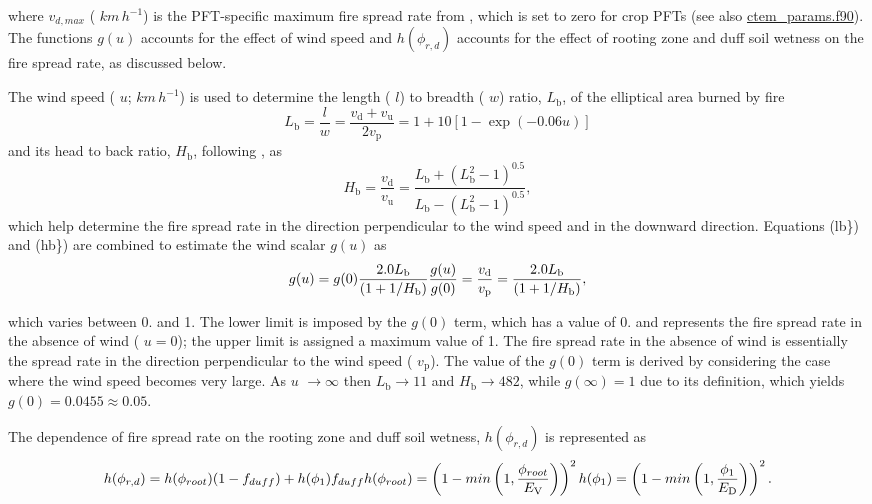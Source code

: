 where $v_{d,max}$ ( $km\,h^{-1}$) is the P\+F\+T-\/specific maximum fire spread rate from \cite{Li20121c2}, which is set to zero for crop P\+F\+Ts (see also \hyperlink{ctem__params_8f90}{ctem\+\_\+params.\+f90}). The functions $g(u)$ accounts for the effect of wind speed and $ h(\phi_{r, d})$ accounts for the effect of rooting zone and duff soil wetness on the fire spread rate, as discussed below.

The wind speed ( $u$; $km\,h^{-1}$) is used to determine the length ( $l$) to breadth ( $w$) ratio, $L_\mathrm{b}$, of the elliptical area burned by fire \[ \label{lb} L_\mathrm{b}= \frac{l}{w} = \frac{v_\mathrm{d} + v_\mathrm{u}}{2v_\mathrm{p}} = 1 + 10 [1 -\exp(-0.06 u)] \] and its head to back ratio, $H_\mathrm{b}$, following \cite{Li20121c2}, as \[ \label{hb} H_\mathrm{b} = \frac{v_\mathrm{d}}{v_\mathrm{u}} = \frac{L_\mathrm{b} + (L_\mathrm{b}^2 - 1)^{0.5}}{L_\mathrm{b} - (L_\mathrm{b}^2 - 1)^{0.5}}, \] which help determine the fire spread rate in the direction perpendicular to the wind speed and in the downward direction. Equations (lb\}) and (hb\}) are combined to estimate the wind scalar $g(u)$ as \[ g(u)= g(0) \frac{2.0 L_\mathrm{b}}{(1 + 1/H_\mathrm{b})} \nonumber\\ \frac{g(u)}{g(0)}=\frac{v_\mathrm{d}}{v_\mathrm{p}} = \frac{2.0 L_\mathrm{b}}{(1 + 1/H_\mathrm{b})}, \]

which varies between 0. and 1. The lower limit is imposed by the $g(0)$ term, which has a value of 0. and represents the fire spread rate in the absence of wind ( $u = 0$); the upper limit is assigned a maximum value of 1. The fire spread rate in the absence of wind is essentially the spread rate in the direction perpendicular to the wind speed ( $v_\mathrm{p}$). The value of the $g(0)$ term is derived by considering the case where the wind speed becomes very large. As $u$ $\rightarrow \infty$ then $L_\mathrm{b} \rightarrow 11$ and $H_\mathrm{b} \rightarrow 482$, while $g(\infty)=1$ due to its definition, which yields $g(0) = 0.0455 \approx 0.05$.

The dependence of fire spread rate on the rooting zone and duff soil wetness, $h(\phi_{r, d})$ is represented as \[ h(\phi_{r, d})= h(\phi_{root})(1-f_{duff}) + h(\phi_{1})f_{duff}\nonumber \\ h(\phi_{root})= \left(1-min \left(1,\frac{\phi_{root}}{E_\mathrm{V}} \right) \right)^2\nonumber \\ h(\phi_{1})= \left(1-min \left(1,\frac{\phi_{1}}{E_\mathrm{D}} \right) \right)^2. \]

